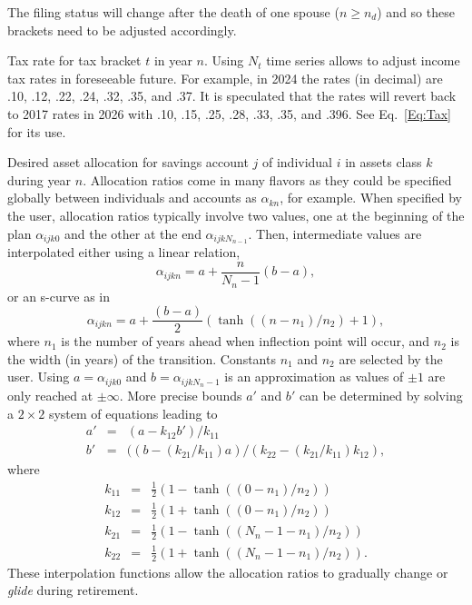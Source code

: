 \documentclass{report}[fleqn,12pt]
\begin{document}
\begin{description}[leftmargin=4em,style=multiline]
	The filing status will change after the death of one spouse ($n \ge n_d$) and so these
	brackets need to be adjusted accordingly.
\item [$\theta_{tn}$]
	Tax rate for tax bracket $t$ in year $n$. Using $N_t$ time series allows to adjust income
	tax rates in foreseeable future.
	For example, in 2024 the rates (in decimal) are .10, .12, .22, .24, .32, .35, and .37.
	It is speculated that the rates will revert back to 2017 rates in 2026 with
	.10, .15, .25, .28, .33, .35, and .396. See Eq.~\ref{Eq:Tax} for its use.
\item [$\alpha_{ijkn}$]
	Desired asset allocation for savings account $j$ of individual $i$ in assets class $k$ during year $n$.
	Allocation ratios come in many flavors as they could be specified globally between
	individuals and accounts as $\alpha_{kn}$, for example.
	When specified by the user, allocation ratios typically involve two values, one at the
	beginning of the plan $\alpha_{ijk0}$ and the other at the end
	$\alpha_{ijkN_{n-1}}$. Then, intermediate values are interpolated either using
	a linear relation,
\begin{equation}
	\alpha_{ijkn} = a + \frac{n}{N_n - 1} (b - a),
\end{equation}
or an s-curve as in
\begin{equation}
	\alpha_{ijkn} = a + \frac{(b - a)}{2}
	(\tanh((n-n_1)/n_2) + 1),
\end{equation}
	where $n_1$ is the number of years ahead when inflection point will occur, and $n_2$ is the
	width (in years) of the transition. Constants $n_1$ and $n_2$ are selected by the user.
	Using $a = \alpha_{ijk0}$ and $b = \alpha_{ijkN_n-1}$ is an approximation as values of $\pm 1$
	are only reached at $\pm \infty$.
	More precise bounds $a'$ and $b'$ can be determined by solving a $2\times 2$ system
	of equations leading to
	\begin{eqnarray}
		a' &=& (a - k_{12}b')/k_{11} \nonumber \\
		b' &=& ((b - (k_{21}/k_{11})a)/(k_{22} - (k_{21}/k_{11})k_{12}),
	\end{eqnarray}
	where
	\begin{eqnarray}
		k_{11} &=& \frac{1}{2}(1 - \tanh((0-n_1)/n_2)) \nonumber \\
		k_{12} &=& \frac{1}{2}(1 + \tanh((0-n_1)/n_2)) \nonumber \\
		k_{21} &=& \frac{1}{2}(1 - \tanh((N_n-1-n_1)/n_2)) \nonumber \\
		k_{22} &=& \frac{1}{2}(1 + \tanh((N_n-1-n_1)/n_2)).
	\end{eqnarray}
	These interpolation functions allow the allocation ratios to gradually change
	or {\em glide} during retirement.


\end{description}
\end{document}
